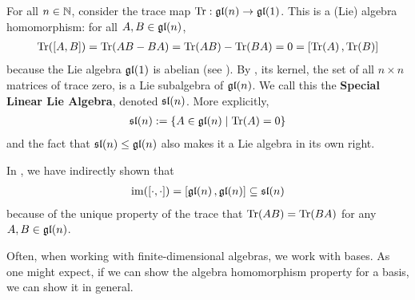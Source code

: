 \begin{boxexample}\label{Ch1:Eg:sl}
    For all $n \in \N$, consider the trace map $\operatorname{Tr} : \gl{n} \to \gl{1}$. This is a (Lie) algebra homomorphism: for all $A, B \in \gl{n}$,
    \begin{align*}
        \Tr{\brac{A, B}} = \Tr{AB - BA} = \Tr{AB} - \Tr{BA} = 0 = \brac{\Tr{A}, \Tr{B}}
    \end{align*}
    because the Lie algebra $\gl{1}$ is abelian (see ). By , its kernel, the set of all $n \times n$ matrices of trace zero, is a Lie subalgebra of $\gl{n}$. We call this the \textbf{Special Linear Lie Algebra}, denoted $\sl{n}$. More explicitly,
    \begin{align*}
        \sl{n} := \setst{A \in \gl{n}}{\Tr{A} = 0}
    \end{align*}
    and the fact that $\sl{n} \leq \gl{n}$ also makes it a Lie algebra in its own right.
\end{boxexample}

\begin{remark}
    In , we have indirectly shown that
    \begin{align*}
        \pim{\liebrac} = \brac{\gl{n}, \gl{n}} \subseteq \sl{n}
    \end{align*}
    because of the unique property of the trace that $\Tr{AB} = \Tr{BA}$ for any $A, B \in \gl{n}$.
\end{remark}

Often, when working with finite-dimensional algebras, we work with bases. As one might expect, if we can show the algebra homomorphism property for a basis, we can show it in general.

